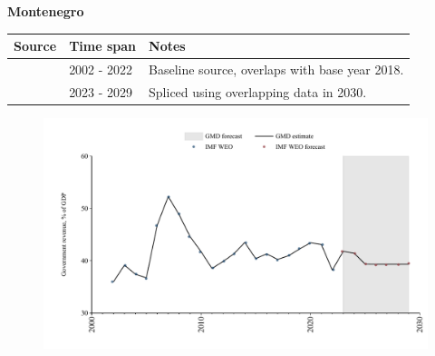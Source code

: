 \documentclass[12pt,a4paper,landscape]{article}
\begin{document}
\begin{adjustbox}{max totalsize={\paperwidth}{\paperheight},center}
\begin{minipage}[t][\textheight][t]{\textwidth}
\vspace*{0.5cm}
{}
\begin{center}
{\Large\bfseries Montenegro}
\end{center}
\vspace{0.5cm}
\begin{table}[H]
\centering
\small
\begin{tabular}{|l|l|l|}
\hline
\textbf{Source} & \textbf{Time span} & \textbf{Notes} \\
\hline
\rowcolor{white}\cite{IMF_WEO}& 2002 - 2022 &Baseline source, overlaps with base year 2018.\\
\rowcolor{lightgray}\cite{IMF_WEO_forecast}& 2023 - 2029 &Spliced using overlapping data in 2030.\\
\hline
\end{tabular}
\end{table}
\begin{figure}[H]
\centering
\includegraphics[width=\textwidth,height=0.6\textheight,keepaspectratio]{graphs/MNE_govrev_GDP.pdf}
\end{figure}
\end{minipage}
\end{adjustbox}
\end{document}
